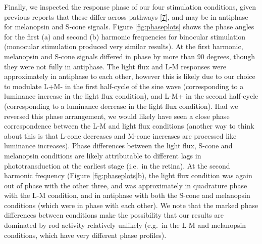 \documentclass[
]{article}
\begin{document}
Finally, we inspected the response phase of our four stimulation conditions, given previous reports that these differ across pathways {[}\protect\hyperlink{ref-Spitschan2014}{7}{]}, and may be in antiphase for melanopsin and S-cone signals. Figure \ref{fig:phaseplots} shows the phase angles for the first (a) and second (b) harmonic frequencies for binocular stimulation (monocular stimulation produced very similar results). At the first harmonic, melanopsin and S-cone signals differed in phase by more than 90 degrees, though they were not fully in antiphase. The light flux and L-M responses were approximately in antiphase to each other, however this is likely due to our choice to modulate L+M- in the first half-cycle of the sine wave (corresponding to a luminance increase in the light flux condition), and L-M+ in the second half-cycle (corresponding to a luminance decrease in the light flux condition). Had we reversed this phase arrangement, we would likely have seen a close phase correspondence between the L-M and light flux conditions (another way to think about this is that L-cone decreases and M-cone increases are processed like luminance increases). Phase differences between the light flux, S-cone and melanopsin conditions are likely attributable to different lags in phototransduction at the earliest stage (i.e.~in the retina). At the second harmonic frequency (Figure \ref{fig:phaseplots}b), the light flux condition was again out of phase with the other three, and was approximately in quadrature phase with the L-M condition, and in antiphase with both the S-cone and melanopsin conditions (which were in phase with each other). We note that the marked phase differences between conditions make the possibility that our results are dominated by rod activity relatively unlikely (e.g.~in the L-M and melanopsin conditions, which have very different phase profiles).
\end{document}
